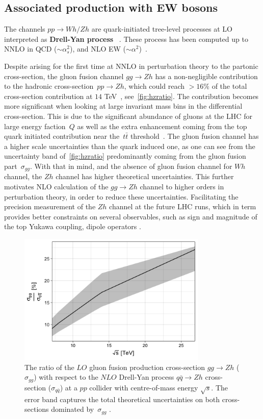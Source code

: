 \subsection{Associated production with EW bosons}
The channels $pp\to Wh/Zh$ are  quark-initiated tree-level processes at LO interpreted as \textbf{Drell-Yan process}~ \cite{Han:1991ia,Brein:2003wg}. These process has been computed up to  NNLO in QCD ($\sim \alpha_s^2$), and  NLO  EW  ($\sim \alpha^2 $)~\cite{Amoroso:2020lgh}.
\par Despite arising for the first time at NNLO in perturbation theory to the partonic cross-section, the gluon fusion channel $g g \rightarrow Zh$ has a non-negligible contribution to the hadronic cross-section~$pp\to Zh$, which could reach $>16\%$ of the total cross-section contribution at $14$ TeV~\cite{Cepeda:2019klc}, see~\autoref{fig:hzratio}. The contribution becomes more significant when looking at large invariant mass bins in the differential cross-section. This is due to the significant abundance of gluons at the LHC for large energy faction~$Q$ as well as the extra enhancement coming from the top quark initiated contribution near the~$t\bar t$ threshold~\cite{Englert:2013vua}.  The gluon fusion channel has a higher scale uncertainties than the quark induced one, as one can see from the uncertainty band of~\autoref{fig:hzratio} predominantly coming from the gluon fusion part~$\sigma_{gg}$.  With that in mind, and the absence of gluon fusion channel for $Wh$ channel, the $Zh$ channel has higher theoretical uncertainties. This further motivates NLO calculation of the  $g g \rightarrow Z h$ channel to higher orders in perturbation theory,  in order to reduce these uncertainties. Facilitating the precision measurement of the $Zh$ channel at the future LHC runs, which in term provides better constraints on several observables, such as sign and magnitude of the top Yukawa coupling,  dipole operators \cite{Englert:2016hvy}.
\begin{figure}
	\begin{center}
		\includegraphics[width=9cm]{./figures/Rplot}
		\caption{The ratio of the $LO$ gluon fusion production cross-section $ gg \to Zh$  ($\sigma_{gg}$) with respect to the $NLO$ Drell-Yan process $ q\bar{q} \to Zh$ cross-section ($\sigma_{q\bar{q}}$) at a $pp$ collider with centre-of-mass energy $\sqrt{s}$. The error band captures the total theoretical uncertainties on both cross-sections dominated by~$\sigma_{gg}$ .}
		\label{fig:hzratio}
	\end{center}
\end{figure}
